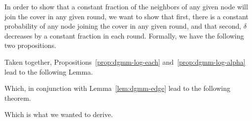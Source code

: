In order to show that a constant fraction of the neighbors of any given node will join the cover in any given round, we want to show that first, there is a constant probability of any node joining the cover in any given round, and that second, $\delta$ decreases by a constant fraction in each round. Formally, we have the following two propositions.







Taken together, Propositions~\ref{prop:dgmm-log-each} and~\ref{prop:dgmm-log-alpha} lead to the following Lemma.



Which, in conjunction with Lemma~\ref{lem:dgmm-edge} lead to the following theorem.



Which is what we wanted to derive.

